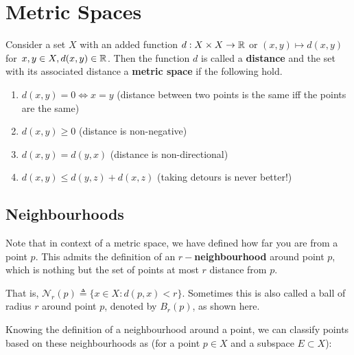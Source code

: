 \section{Metric Spaces}
Consider a set $X$ with an added function $d:X\times X\rightarrow \mathbb{R}$ or $(x,y)\mapsto d(x,y)$ for $\,x,y\in X, d(x,y)\in\mathbb{R}$. Then the function $d$ is called a \textbf{distance} and the set with its associated distance a \textbf{metric space} if the following hold.
\begin{enumerate}[label=M\arabic*.]
\item $d(x,y) = 0\iff x=y$ (distance between two points is the same iff the points are the same)
\item $d(x,y)\geq 0$ (distance is non-negative)
\item $d(x,y)=d(y,x)$ (distance is non-directional)
\item $d(x,y)\leq d(y,z)+d(x,z)$ (taking detours is never better!)
\end{enumerate}

\subsection{Neighbourhoods}
Note that in context of a metric space, we have defined how far you are from a point $p$. This admits the definition of an  \textbf{$r-$neighbourhood} around point $p$, which is nothing but the set of points at most $r$ distance from $p$.

That is, $\mathcal{N}_r(p)\triangleq \{x\in X:d(p,x)<r\}$. Sometimes this is also called a ball of radius $r$ around point $p$, denoted by $B_r(p)$, as shown here.\\

\begin{center}
\end{center}

Knowing the definition of a neighbourhood around a point, we can classify points based on these neighbourhoods as (for a point $p\in X$ and a subspace $E\subset X$):


